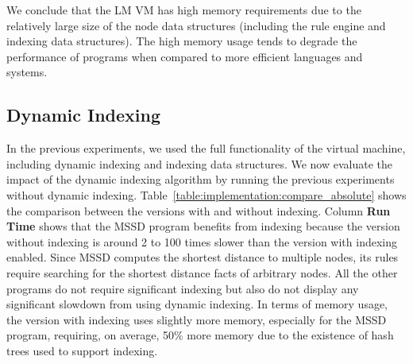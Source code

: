 We conclude that the LM VM has high memory requirements due to the relatively
large size of the node data structures (including the rule engine and indexing
data structures). The high memory usage tends to degrade the performance of
programs when compared to more efficient languages and systems.

\subsection{Dynamic Indexing}

In the previous experiments, we used the full functionality of the virtual
machine, including dynamic indexing and indexing data structures. We now
evaluate the impact of the dynamic indexing algorithm by running the previous
experiments without dynamic indexing.
Table~\ref{table:implementation:compare_absolute} shows the comparison between
the versions with and without indexing.  Column \textbf{Run Time} shows that the
MSSD program benefits from indexing because the version without indexing is
around 2 to 100 times slower than the version with indexing enabled. Since MSSD
computes the shortest distance to multiple nodes, its rules require searching
for the shortest distance facts of arbitrary nodes. All the other programs do
not require significant indexing but also do not display any significant
slowdown from using dynamic indexing. In terms of memory usage, the version with
indexing uses slightly more memory, especially for the MSSD program, requiring,
on average, 50\% more memory due to the existence of hash trees used to support
indexing.

\begin{table}[ht]
   \begin{center}
      
   \end{center}


   \label{table:implementation:compare_absolute}
\end{table}
